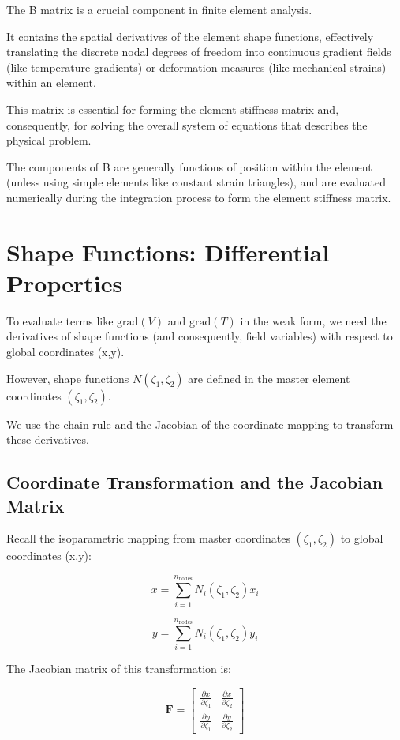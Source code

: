 \documentclass[
  11pt,
  a4paper,
]{scrbook}
\begin{document}
The B matrix is a crucial component in finite element analysis.

It contains the spatial derivatives of the element shape functions,
effectively translating the discrete nodal degrees of freedom into
continuous gradient fields (like temperature gradients) or deformation
measures (like mechanical strains) within an element.

This matrix is essential for forming the element stiffness matrix and,
consequently, for solving the overall system of equations that describes
the physical problem.

The components of B are generally functions of position within the
element (unless using simple elements like constant strain triangles),
and are evaluated numerically during the integration process to form the
element stiffness matrix.

\section{Shape Functions: Differential
Properties}\label{shape-functions-differential-properties-1}

To evaluate terms like \(\text{grad}(V)\) and \(\text{grad}(T)\) in the
weak form, we need the derivatives of shape functions (and consequently,
field variables) with respect to global coordinates (x,y).

However, shape functions \(N(\zeta_1, \zeta_2)\) are defined in the
master element coordinates \((\zeta_1, \zeta_2)\).

We use the chain rule and the Jacobian of the coordinate mapping to
transform these derivatives.

\subsection{Coordinate Transformation and the Jacobian
Matrix}\label{coordinate-transformation-and-the-jacobian-matrix}

Recall the isoparametric mapping from master coordinates
\((\zeta_1, \zeta_2)\) to global coordinates (x,y):

\[x = \sum_{i=1}^{n_{\text{nodes}}} N_i(\zeta_1, \zeta_2) x_i\]

\[y = \sum_{i=1}^{n_{\text{nodes}}} N_i(\zeta_1, \zeta_2) y_i\]

The Jacobian matrix of this transformation is:

\[\mathbf{F} = \begin{bmatrix} \frac{\partial x}{\partial \zeta_1} & \frac{\partial x}{\partial \zeta_2} \\ \frac{\partial y}{\partial \zeta_1} & \frac{\partial y}{\partial \zeta_2} \end{bmatrix}\]
\end{document}
